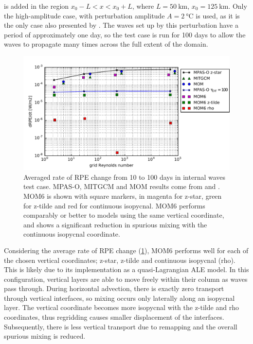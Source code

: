 is added in the region $x_0 - L < x < x_0 + L$, where $L = \SI{50}{\kilo\metre}$, $x_0 = \SI{125}{\kilo\metre}$. Only the high-amplitude case, with perturbation amplitude $A = \SI{2}{\celsius}$ is used, as it is the only case also presented by \citet{petersen15}. The waves set up by this perturbation have a period of approximately one day, so the test case is run for 100 days to allow the waves to propagate many times across the full extent of the domain.


\begin{figure}
  \includegraphics{../plots/internal_waves_drpe.pdf}
  \caption{\label{fig:waves-drpe} Averaged rate of RPE change from 10 to 100 days in internal waves test case. MPAS-O, MITGCM and MOM results come from \citet{petersen15} and \citet{ilicak12}. MOM6 is shown with square markers, in magenta for z-star, green for z-tilde and red for continuous isopycnal. MOM6 performs comparably or better to models using the same vertical coordinate, and shows a significant reduction in spurious mixing with the continuous isopycnal coordinate.}
\end{figure}


Considering the average rate of RPE change (\cref{fig:waves-drpe}), MOM6 performs well for each of the chosen vertical coordinates; z-star, z-tilde and continuous isopycnal (rho). This is likely due to its implementation as a quasi-Lagrangian ALE model. In this configuration, vertical layers are able to move freely within their column as waves pass through. During horizontal advection, there is exactly zero transport through vertical interfaces, so mixing occurs only laterally along an isopycnal layer. The vertical coordinate becomes more isopycnal with the z-tilde and rho coordinates, thus regridding causes smaller displacement of the interfaces. Subsequently, there is less vertical transport due to remapping and the overall spurious mixing is reduced.

